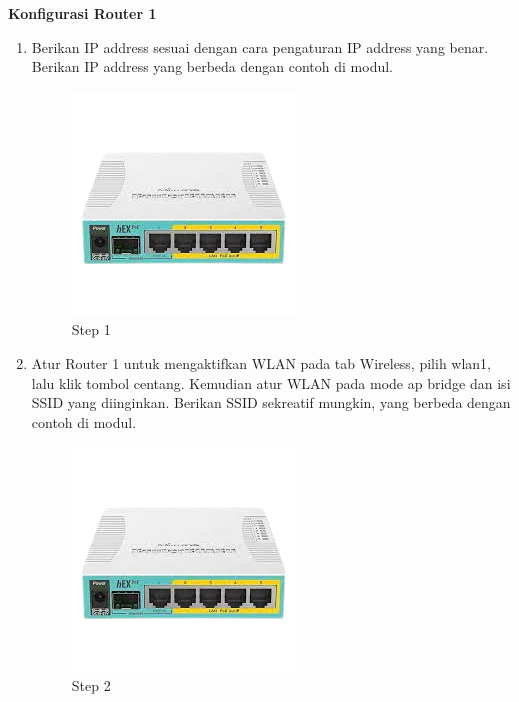 \begin{center} 
	\textbf{Konfigurasi Router 1}
\end{center}

\begin{enumerate}
	\item Berikan IP address sesuai dengan cara pengaturan IP address yang benar. Berikan IP address
	yang berbeda dengan contoh di modul.	
	\begin{figure}[H]
		\centering
		\includegraphics[width=0.5\linewidth]{P1/img/contoh.png}
		\caption{Step 1}
		\label{fig:gambar10}
	\end{figure}

	\item Atur Router 1 untuk mengaktifkan WLAN pada tab Wireless, pilih wlan1, lalu klik tombol centang. Kemudian atur WLAN pada mode ap bridge dan isi SSID yang diinginkan. Berikan SSID
	sekreatif mungkin, yang berbeda dengan contoh di modul.
	\begin{figure}[H]
		\centering
		\includegraphics[width=0.5\linewidth]{P1/img/contoh.png}
		\caption{Step 2}
		\label{fig:gambar11}
	\end{figure}

\end{enumerate}

